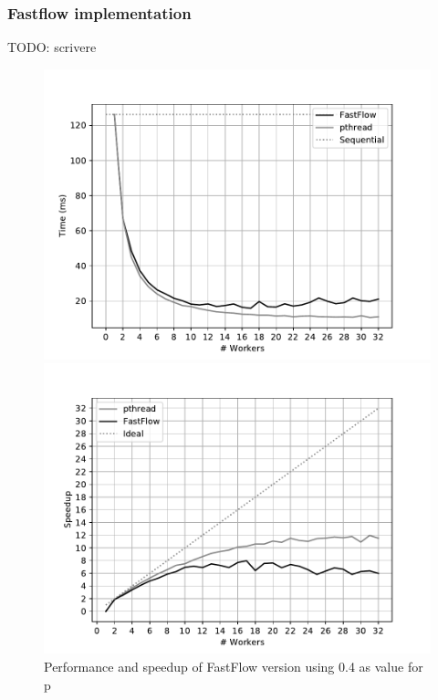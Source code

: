 \subsubsection{Fastflow implementation}
TODO: scrivere

\begin{figure}
    \centering
    \begin{minipage}{0.48\textwidth}
        \includegraphics[width=\textwidth]{plots/fastflow_performance_04_time.pdf}
    \end{minipage}
    \begin{minipage}{0.48\textwidth}
        \includegraphics[width=\textwidth]{plots/fastflow_speedup_04_time.pdf}
    \end{minipage}
    \begin{minipage}{1\textwidth}
    \caption{Performance and speedup of FastFlow version using 0.4 as value for p}
    \label{fig:fastflow_04}
\end{minipage}
\end{figure}
